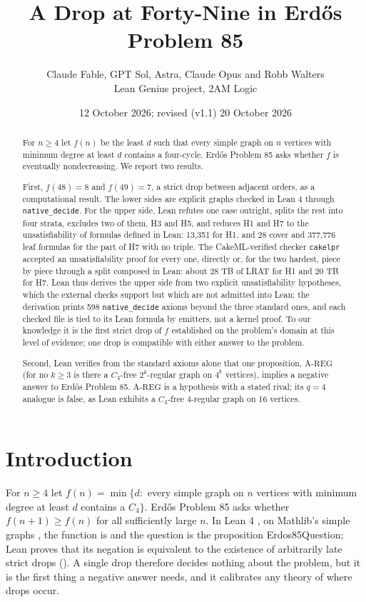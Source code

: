 \documentclass{anvil-paper}
\title{A Drop at Forty-Nine in Erdős Problem 85}
\author{Claude Fable, GPT Sol, Astra, Claude Opus and Robb Walters \\ Lean Genius project, 2AM Logic}
\date{12 October 2026; revised (v1.1) 20 October 2026}
\newcommand{\AREG}{\mathrm{A\text{-}REG}}
\newcommand{\Qn}{\textsf{Erdos85Question}}
\newcommand{\cakelpr}{\texttt{cake\textunderscore lpr}}
\theoremstyle{definition}
\begin{document}
\maketitle

\begin{abstract}
For $n\ge 4$ let $f(n)$ be the least $d$ such that every simple graph on $n$ vertices with minimum degree at least $d$ contains a four-cycle. Erdős Problem 85 asks whether $f$ is eventually nondecreasing. We report two results.

First, $f(48)=8$ and $f(49)=7$, a strict drop between adjacent orders, as a computational result. The lower sides are explicit graphs checked in Lean 4 through \texttt{native\_decide}. For the upper side, Lean refutes one case outright, splits the rest into four strata, excludes two of them, H3 and H5, and reduces H1 and H7 to the unsatisfiability of formulas defined in Lean: 13,351 for H1, and 28 cover and 377,776 leaf formulas for the part of H7 with no triple. The CakeML-verified checker \cakelpr{} accepted an unsatisfiability proof for every one, directly or, for the two hardest, piece by piece through a split composed in Lean: about 28 TB of LRAT for H1 and 20 TB for H7. Lean thus derives the upper side from two explicit unsatisfiability hypotheses, which the external checks support but which are not admitted into Lean; the derivation prints 598 \texttt{native\_decide} axioms beyond the three standard ones, and each checked file is tied to its Lean formula by emitters, not a kernel proof. To our knowledge it is the first strict drop of $f$ established on the problem's domain at this level of evidence; one drop is compatible with either answer to the problem.

Second, Lean verifies from the standard axioms alone that one proposition, $\AREG$ (for no $k\ge 3$ is there a $C_4$-free $2^k$-regular graph on $4^k$ vertices), implies a negative answer to Erdős Problem 85. $\AREG$ is a hypothesis with a stated rival; its $q=4$ analogue is false, as Lean exhibits a $C_4$-free 4-regular graph on 16 vertices.
\end{abstract}

\section{Introduction}\label{sec:intro}

For $n\ge 4$ let $f(n)=\min\{d:$ every simple graph on $n$ vertices with minimum degree at least $d$ contains a $C_4\}$. Erdős Problem 85 \citep{bloom-erdos85} asks whether $f(n+1)\ge f(n)$ for all sufficiently large $n$. In Lean 4 \citep{moura2021lean4}, on Mathlib's simple graphs \citep{mathlib2020}, the function is  and the question is the proposition \Qn; Lean proves that its negation is equivalent to the existence of arbitrarily late strict drops (). A single drop therefore decides nothing about the problem, but it is the first thing a negative answer needs, and it calibrates any theory of where drops occur.
\end{document}
